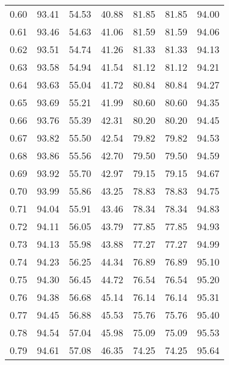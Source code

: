 \begin{tabular}{|c|c|c|c|c|c|c|}
      0.60 &     93.41 &     54.53 &      40.88 &   81.85 &      81.85 &         94.00 \\
      0.61 &     93.46 &     54.63 &      41.06 &   81.59 &      81.59 &         94.06 \\
      0.62 &     93.51 &     54.74 &      41.26 &   81.33 &      81.33 &         94.13 \\
      0.63 &     93.58 &     54.94 &      41.54 &   81.12 &      81.12 &         94.21 \\
      0.64 &     93.63 &     55.04 &      41.72 &   80.84 &      80.84 &         94.27 \\
      0.65 &     93.69 &     55.21 &      41.99 &   80.60 &      80.60 &         94.35 \\
      0.66 &     93.76 &     55.39 &      42.31 &   80.20 &      80.20 &         94.45 \\
      0.67 &     93.82 &     55.50 &      42.54 &   79.82 &      79.82 &         94.53 \\
      0.68 &     93.86 &     55.56 &      42.70 &   79.50 &      79.50 &         94.59 \\
      0.69 &     93.92 &     55.70 &      42.97 &   79.15 &      79.15 &         94.67 \\
      0.70 &     93.99 &     55.86 &      43.25 &   78.83 &      78.83 &         94.75 \\
      0.71 &     94.04 &     55.91 &      43.46 &   78.34 &      78.34 &         94.83 \\
      0.72 &     94.11 &     56.05 &      43.79 &   77.85 &      77.85 &         94.93 \\
      0.73 &     94.13 &     55.98 &      43.88 &   77.27 &      77.27 &         94.99 \\
      0.74 &     94.23 &     56.25 &      44.34 &   76.89 &      76.89 &         95.10 \\
      0.75 &     94.30 &     56.45 &      44.72 &   76.54 &      76.54 &         95.20 \\
      0.76 &     94.38 &     56.68 &      45.14 &   76.14 &      76.14 &         95.31 \\
      0.77 &     94.45 &     56.88 &      45.53 &   75.76 &      75.76 &         95.40 \\
      0.78 &     94.54 &     57.04 &      45.98 &   75.09 &      75.09 &         95.53 \\
      0.79 &     94.61 &     57.08 &      46.35 &   74.25 &      74.25 &         95.64 \\

\end{tabular}
